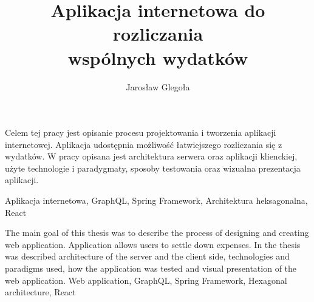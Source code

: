 \documentclass[
    left=2.5cm,         %
    right=2.5cm,        %
    top=2.5cm,          %
    bottom=3cm,         %
    bindingoffset=6mm,  %
    nohyphenation=false %
]{eiti/eiti-thesis}
\begin{document}
\EngineerThesis %
{}
\title{
    Aplikacja internetowa do rozliczania\\ wspólnych wydatków
}
\author{Jarosław Glegoła}
\date{\the\year}
\maketitle

\cleardoublepage %
\streszczenie Celem tej pracy jest opisanie procesu projektowania i tworzenia aplikacji internetowej. Aplikacja udostępnia możliwość łatwiejszego rozliczania się z wydatków. W pracy opisana jest architektura serwera oraz aplikacji klienckiej, użyte technologie i paradygmaty, sposoby testowania oraz wizualna prezentacja aplikacji.

\slowakluczowe Aplikacja internetowa, GraphQL, Spring Framework, Architektura heksagonalna, React

\newpage
\abstract The main goal of this thesis was to describe the process of designing and creating web application. Application allows users to settle down expenses. In the thesis was described architecture of the server and the client side, technologies and paradigms used, how the application was tested and visual presentation of the web application.
\keywords Web application, GraphQL, Spring Framework, Hexagonal architecture, React

\cleardoublepage  %
\pagestyle{plain}
\makeauthorship

\cleardoublepage %
\tableofcontents

\cleardoublepage %
\pagestyle{headings}
\end{document}
